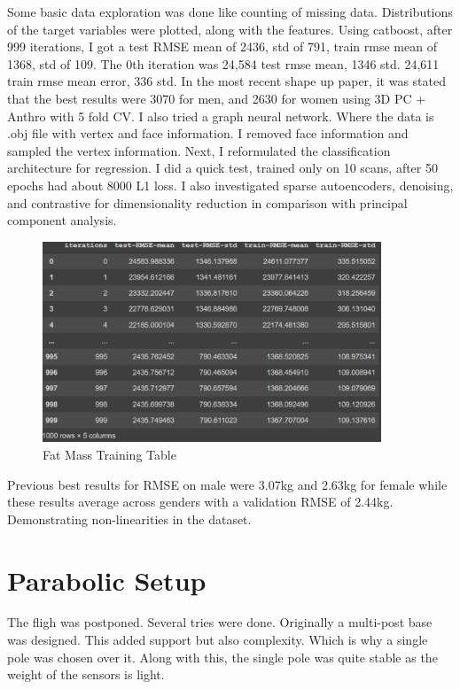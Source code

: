 Some basic data exploration was done like counting of missing data. Distributions of the target variables were plotted, along with the features. Using catboost, after 999 iterations, I got a test RMSE mean of 2436, std of 791, train rmse mean of 1368, std of 109. The 0th iteration was 24,584 test rmse mean, 1346 std. 24,611 train rmse mean error, 336 std. In the most recent shape up paper, it was stated that the best results were 3070 for men, and 2630 for women using 3D PC + Anthro with 5 fold CV. I also tried a graph neural network. Where the data is .obj file with vertex and face information. I removed face information and sampled the vertex information. Next, I reformulated the classification architecture for regression. I did a quick test, trained only on 10 scans, after 50 epochs had about 8000 L1 loss. I also investigated sparse autoencoders, denoising, and contrastive for dimensionality reduction in comparison with principal component analysis.


\begin{figure}[h]
	\caption{Fat Mass Training Table}
	\centering
	\includegraphics[width=0.9\textwidth]{images/catboost_training.png}
\end{figure}

Previous best results for RMSE on male were 3.07kg and 2.63kg for female while these results average across genders with a validation RMSE of 2.44kg. Demonstrating non-linearities in the dataset.

\section{Parabolic Setup}
The fligh was postponed. Several tries were done. Originally a multi-post base was designed. This added support but also complexity. Which is why a single pole was chosen over it. Along with this, the single pole was quite stable as the weight of the sensors is light.

